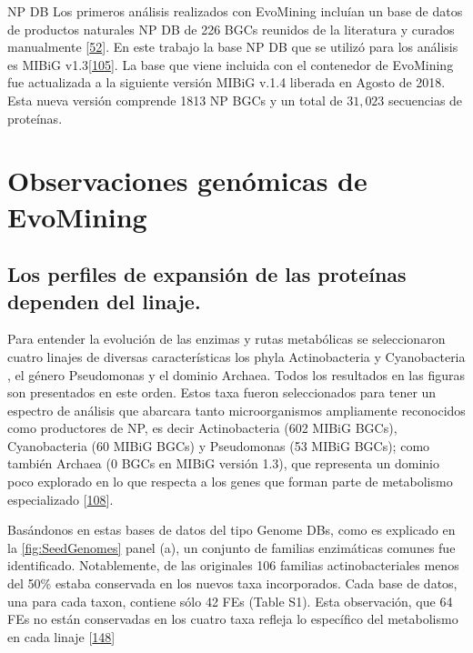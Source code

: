 \documentclass[12pt,twoside]{reedthesis}
\begin{document}
  NP DB Los primeros análisis realizados con EvoMining incluían un base de
  datos de productos naturales NP DB de 226 BGCs reunidos de la literatura
  y curados manualmente
  {[}\protect\hyperlink{ref-cruz-morales_phylogenomic_2016}{52}{]}. En
  este trabajo la base NP DB que se utilizó para los análisis es MIBiG
  v1.3{[}\protect\hyperlink{ref-medema_minimum_2015}{105}{]}. La base que
  viene incluida con el contenedor de EvoMining fue actualizada a la
  siguiente versión MIBiG v.1.4 liberada en Agosto de 2018. Esta nueva
  versión comprende 1813 NP BGCs y un total de \(31,023\) secuencias de
  proteínas.
  
  \section{Observaciones genómicas de
  EvoMining}\label{observaciones-genomicas-de-evomining}
  
  \subsection{Los perfiles de expansión de las proteínas dependen del
  linaje.}\label{los-perfiles-de-expansion-de-las-proteinas-dependen-del-linaje.}
  
  Para entender la evolución de las enzimas y rutas metabólicas se
  seleccionaron cuatro linajes de diversas características los phyla
  Actinobacteria y Cyanobacteria , el género Pseudomonas y el dominio
  Archaea. Todos los resultados en las figuras son presentados en este
  orden. Estos taxa fueron seleccionados para tener un espectro de
  análisis que abarcara tanto microorganismos ampliamente reconocidos como
  productores de NP, es decir Actinobacteria (602 MIBiG BGCs),
  Cyanobacteria (60 MIBiG BGCs) y Pseudomonas (53 MIBiG BGCs); como
  también Archaea (0 BGCs en MIBiG versión 1.3), que representa un dominio
  poco explorado en lo que respecta a los genes que forman parte de
  metabolismo especializado
  {[}\protect\hyperlink{ref-charlesworth_untapped_2015}{108}{]}.
  
  Basándonos en estas bases de datos del tipo Genome DBs, como es
  explicado en la \autoref{fig:SeedGenomes} panel (a), un conjunto de
  familias enzimáticas comunes fue identificado. Notablemente, de las
  originales 106 familias actinobacteriales menos del 50\% estaba
  conservada en los nuevos taxa incorporados. Cada base de datos, una para
  cada taxon, contiene sólo 42 FEs (Table S1). Esta observación, que 64
  FEs no están conservadas en los cuatro taxa refleja lo específico del
  metabolismo en cada linaje
  {[}\protect\hyperlink{ref-jordan_lineage-specific_2001}{148}{]}
  
\end{document}
